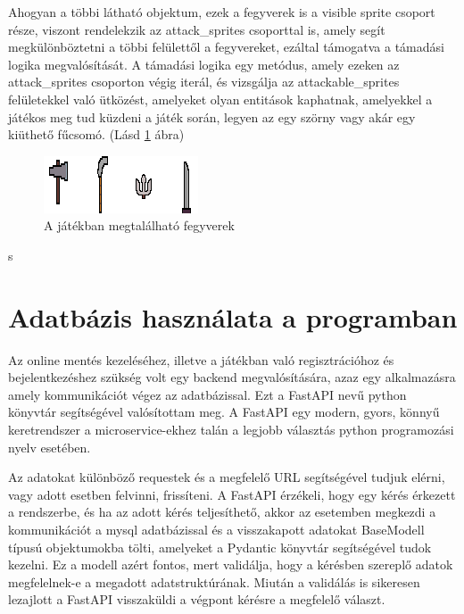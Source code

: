 Ahogyan a többi látható objektum, ezek a fegyverek is a visible sprite csoport része, viszont rendelekzik az attack\_sprites csoporttal is, amely segít megkülönböztetni a többi felülettől a fegyvereket, ezáltal támogatva a támadási logika megvalósítását. A támadási logika egy metódus, amely ezeken az attack\_sprites csoporton végig iterál, és vizsgálja az attackable\_sprites felületekkel való ütközést, amelyeket olyan entitások kaphatnak, amelyekkel a játékos meg tud küzdeni a játék során, legyen az egy szörny vagy akár egy kiüthető fűcsomó. (Lásd \ref{fig:A játékban megtalálható fegyverek} ábra)

\begin{figure}[H]
    \centering
    \includegraphics[width=15.5truecm]{images/weapons.png}
    \caption{A játékban megtalálható fegyverek}
    \label{fig:A játékban megtalálható fegyverek}
\end{figure}
s

\section{Adatbázis használata a programban}

\indent \indent Az online mentés kezeléséhez, illetve a játékban való regisztrációhoz és bejelentkezéshez szükség volt egy backend megvalósítására, azaz egy alkalmazásra amely kommunikációt végez az adatbázissal. Ezt a FastAPI nevű python könyvtár segítségével valósítottam meg. A FastAPI egy modern, gyors, könnyű keretrendszer a microservice-ekhez talán a legjobb választás python programozási nyelv esetében.

Az adatokat különböző requestek és a megfelelő URL segítségével tudjuk elérni, vagy adott esetben felvinni, frissíteni. A FastAPI érzékeli, hogy egy kérés érkezett a rendszerbe, és ha az adott kérés teljesíthető, akkor az esetemben megkezdi a kommunikációt a mysql adatbázissal és a visszakapott adatokat BaseModell típusú objektumokba tölti, amelyeket a Pydantic könyvtár segítségével tudok kezelni. Ez a modell azért fontos, mert validálja, hogy a kérésben szereplő adatok megfelelnek-e a megadott adatstruktúrának. Miután a validálás is sikeresen lezajlott a FastAPI visszaküldi a végpont kérésre a megfelelő választ.

